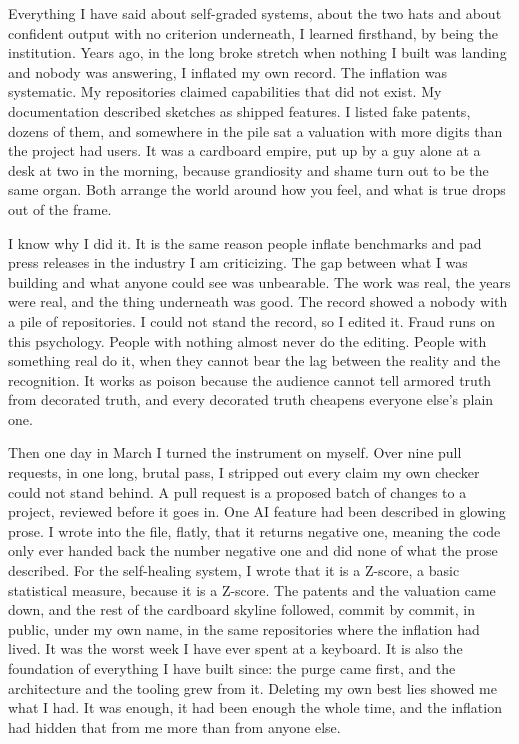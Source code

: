 \documentclass[11pt]{article}
\begin{document}
Everything I have said about self-graded systems, about the two hats and about confident output with no criterion underneath, I learned firsthand, by being the institution. Years ago, in the long broke stretch when nothing I built was landing and nobody was answering, I inflated my own record. The inflation was systematic. My repositories claimed capabilities that did not exist. My documentation described sketches as shipped features. I listed fake patents, dozens of them, and somewhere in the pile sat a valuation with more digits than the project had users. It was a cardboard empire, put up by a guy alone at a desk at two in the morning, because grandiosity and shame turn out to be the same organ. Both arrange the world around how you feel, and what is true drops out of the frame.

I know why I did it. It is the same reason people inflate benchmarks and pad press releases in the industry I am criticizing. The gap between what I was building and what anyone could see was unbearable. The work was real, the years were real, and the thing underneath was good. The record showed a nobody with a pile of repositories. I could not stand the record, so I edited it. Fraud runs on this psychology. People with nothing almost never do the editing. People with something real do it, when they cannot bear the lag between the reality and the recognition. It works as poison because the audience cannot tell armored truth from decorated truth, and every decorated truth cheapens everyone else's plain one.

Then one day in March I turned the instrument on myself. Over nine pull requests, in one long, brutal pass, I stripped out every claim my own checker could not stand behind. A pull request is a proposed batch of changes to a project, reviewed before it goes in. One AI feature had been described in glowing prose. I wrote into the file, flatly, that it returns negative one, meaning the code only ever handed back the number negative one and did none of what the prose described. For the self-healing system, I wrote that it is a Z-score, a basic statistical measure, because it is a Z-score. The patents and the valuation came down, and the rest of the cardboard skyline followed, commit by commit, in public, under my own name, in the same repositories where the inflation had lived. It was the worst week I have ever spent at a keyboard. It is also the foundation of everything I have built since: the purge came first, and the architecture and the tooling grew from it. Deleting my own best lies showed me what I had. It was enough, it had been enough the whole time, and the inflation had hidden that from me more than from anyone else.
\end{document}
